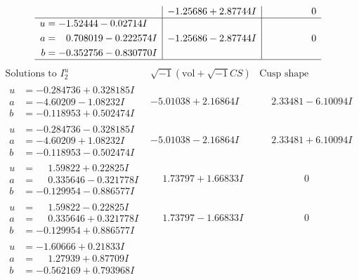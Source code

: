 \documentclass[1p]{elsarticle_modified}
\theoremstyle{definition}
\newcommand{\I}{\sqrt{-1}}
\begin{document}
$$\begin{array}{c|c|c}
 & -1.25686 + 2.87744 I & \phantom{-0.000000 } 0 \\ \hline\begin{aligned}
u &= -1.52444 - 0.02714 I \\
a &= \phantom{-}0.708019 - 0.222574 I \\
b &= -0.352756 - 0.830770 I\end{aligned}
 & -1.25686 - 2.87744 I & \phantom{-0.000000 } 0\\
 \hline 
 \end{array}$$\newpage$$\begin{array}{c|c|c}  
\text{Solutions to }I^u_{2}& \I (\text{vol} + \sqrt{-1}CS) & \text{Cusp shape}\\
 \hline 
\begin{aligned}
u &= -0.284736 + 0.328185 I \\
a &= -4.60209 - 1.08232 I \\
b &= -0.118953 + 0.502474 I\end{aligned}
 & -5.01038 + 2.16864 I & \phantom{-}2.33481 - 6.10094 I \\ \hline\begin{aligned}
u &= -0.284736 - 0.328185 I \\
a &= -4.60209 + 1.08232 I \\
b &= -0.118953 - 0.502474 I\end{aligned}
 & -5.01038 - 2.16864 I & \phantom{-}2.33481 + 6.10094 I \\ \hline\begin{aligned}
u &= \phantom{-}1.59822 + 0.22825 I \\
a &= \phantom{-}0.335646 - 0.321778 I \\
b &= -0.129954 - 0.886577 I\end{aligned}
 & \phantom{-}1.73797 + 1.66833 I & \phantom{-0.000000 } 0 \\ \hline\begin{aligned}
u &= \phantom{-}1.59822 - 0.22825 I \\
a &= \phantom{-}0.335646 + 0.321778 I \\
b &= -0.129954 + 0.886577 I\end{aligned}
 & \phantom{-}1.73797 - 1.66833 I & \phantom{-0.000000 } 0 \\ \hline\begin{aligned}
u &= -1.60666 + 0.21833 I \\
a &= \phantom{-}1.27939 + 0.87709 I \\
b &= -0.562169 + 0.793968 I\end{aligned}

\end{array}$$
\end{document}
